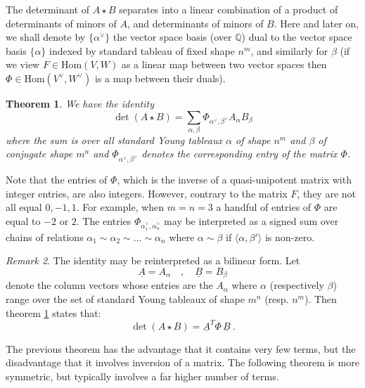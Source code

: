 \documentclass[10pt]{amsart}
\newtheorem{thm}{Theorem}[section]
\theoremstyle{definition}
\theoremstyle{remark}
\newtheorem{rem}[thm]{Remark}
\numberwithin{equation}{section}
\newcommand{\Q}{\mathbb Q}
\newcommand{\lf}{\langle}
\newcommand{\rf}{\rangle}
\newcommand{\0}{\color{blue}{\mathsf{0}}}
\begin{document}
The determinant of $A\star B$ separates into a  linear combination of a product of determinants of minors of $A$, and  determinants of minors of $B$. 
Here and later on, we shall denote by $\{\alpha^{\vee}\}$ the vector space basis (over $\Q$) dual to the  vector space basis $\{\alpha\}$ indexed by standard tableau of fixed shape $n^m$, and similarly for  $\beta$ (if we view $F \in \mathrm{Hom}( V,W)$ as a linear map between two vector spaces then   $\Phi \in \mathrm{Hom}(V^{\vee}, W^{\vee})$ is a map between their duals).

\begin{thm}  \label{thm: detAB}  We have the identity 
\[ \det(A\star B) = \sum_{\alpha, \beta}   \Phi_{\alpha^{\vee},\beta^{\vee}} A_{\alpha} B_{\beta} \]
where the sum is over all standard Young tableaux $\alpha$ of shape $n^m$ and $\beta$ of conjugate shape $m^n$ 
and $\Phi_{\alpha^{\vee},\beta^{\vee}}$ denotes the corresponding entry of the matrix $\Phi$.   \end{thm} 



Note that the entries of  $\Phi$, which is the inverse of a quasi-unipotent matrix with integer entries, are also integers. However,  contrary to the matrix $F$, they  are not all equal  $0, -1, 1$. For example, when $m=n=3$ a   handful of entries of $\Phi$  are equal to $-2$ or $2$. The entries  $\Phi_{\alpha_1^{\vee}, \alpha_n^{\vee}}$ may be interpreted as a signed sum over  chains of relations $\alpha_1\sim \alpha_2 \sim \ldots \sim \alpha_n$ where $\alpha \sim \beta$ if $\lf \alpha, \beta' \rf$ is non-zero. 

\begin{rem} The identity may be reinterpreted as a bilinear form. Let
\[ \underline{A} =  A_{\alpha} \quad , \quad   \underline{B} =  B_{\beta}\]
denote the column vectors whose entries are the  $A_{\alpha}$
where   $\alpha$ (respectively $\beta$) range over the set of standard Young tableaux of shape $m^n$ (resp. $n^m$). Then theorem \ref{thm: detAB}  
states that:
\[  \det(A\star B) =  \underline{A}^T  \Phi\,  \underline{B}\ .\]
\end{rem} 

The previous theorem has the advantage that it contains very few terms, but the disadvantage that it involves inversion of a matrix. 
The following theorem is more symmetric, but typically involves a far higher number of terms. 
\end{document}
